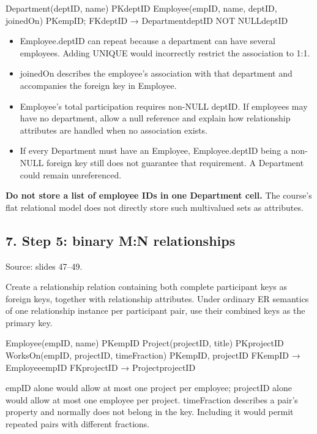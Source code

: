 \begin{StudyCode}
Department(deptID, name)                   PK{deptID}
Employee(empID, name, deptID, joinedOn)
  PK{empID}; FK{deptID} → Department{deptID}
  NOT NULL{deptID}
\end{StudyCode}

\begin{itemize}
\tightlist
\item
  Employee.deptID can repeat because a department can have several employees. Adding UNIQUE would incorrectly restrict the association to 1:1.
\item
  joinedOn describes the employee's association with that department and accompanies the foreign key in Employee.
\item
  Employee's total participation requires non-NULL deptID. If employees may have no department, allow a null reference and explain how relationship attributes are handled when no association exists.
\item
  If every Department must have an Employee, Employee.deptID being a non-NULL foreign key still does not guarantee that requirement. A Department could remain unreferenced.
\end{itemize}

\textbf{Do not store a list of employee IDs in one Department cell.} The course's flat relational model does not directly store such multivalued sets as attributes.

\subsection{7. Step 5: binary M:N relationships}\label{04_er_to_relational_mapping_en-step-5-binary-mn-relationships}

Source: slides 47--49.

Create a relationship relation containing both complete participant keys as foreign keys, together with relationship attributes. Under ordinary ER semantics of one relationship instance per participant pair, use their combined keys as the primary key.

\begin{StudyCode}
Employee(empID, name)                     PK{empID}
Project(projectID, title)                 PK{projectID}
WorksOn(empID, projectID, timeFraction)
  PK{empID, projectID}
  FK{empID} → Employee{empID}
  FK{projectID} → Project{projectID}
\end{StudyCode}

empID alone would allow at most one project per employee; projectID alone would allow at most one employee per project. timeFraction describes a pair's property and normally does not belong in the key. Including it would permit repeated pairs with different fractions.

